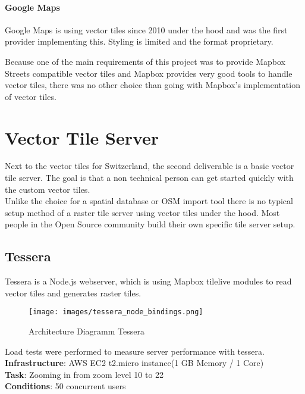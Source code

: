 \paragraph{Google Maps}

Google Maps is using vector tiles since 2010 under the hood and was the
first provider implementing this. Styling is limited and the format
proprietary.


\begin{tcolorbox}[arc=0mm,boxrule=1pt,title=Decision]\label{vector_tile_spec_impl_decision}
Because one of the main requirements of this project was to provide Mapbox Streets compatible vector tiles and Mapbox provides very good tools to handle vector tiles, there was no other choice than going with Mapbox's implementation of vector tiles.
\end{tcolorbox}

\section{Vector Tile Server}\label{vector_tile_server}

Next to the vector tiles for Switzerland, the second deliverable is a basic vector tile server. The goal is that a non technical person can get started quickly with the custom vector tiles.\\

Unlike the choice for a spatial database or OSM import tool
there is no typical setup method of a raster tile server using vector tiles under the hood. Most people in the Open Source community build their own specific tile server setup.

\subsection{Tessera}\label{tessera}

Tessera\cite{13_github_2015} is a Node.js\cite{14_foundation_2015} webserver, which is using Mapbox tilelive\cite{15_github_2015} modules to read vector tiles and generates raster tiles.

\begin{figure}[H]
\centering
  \texttt{[image: images/tessera\_node\_bindings.png]}
  \caption{Architecture Diagramm Tessera}
\end{figure}
\newpage

Load tests were performed to measure server performance with tessera.
\\
\textbf{Infrastructure}: AWS EC2 t2.micro instance(1 GB Memory / 1 Core)\\
\textbf{Task}: Zooming in from zoom level 10 to 22 \\
\textbf{Conditions}: 50 concurrent users \\

